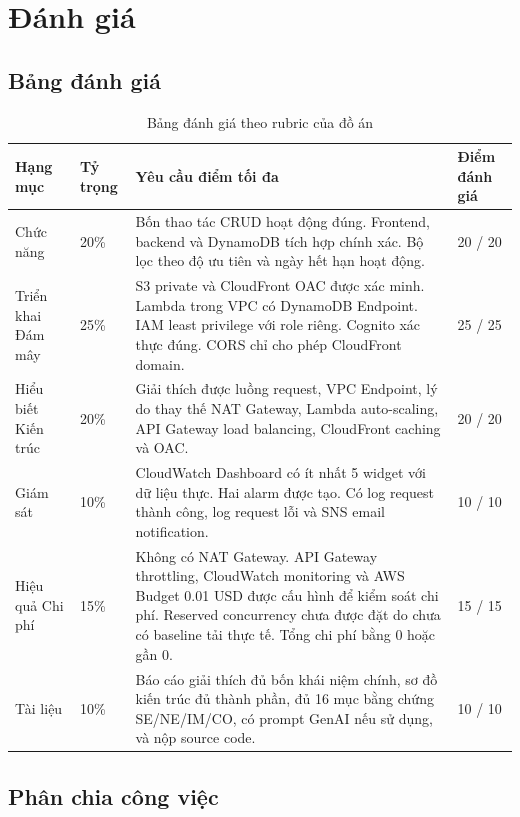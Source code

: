 \section{Đánh giá}

\subsection{Bảng đánh giá}

\begin{table}[H]
\centering
\begin{tabular}{|p{3cm}|p{1.7cm}|p{7.2cm}|p{2.2cm}|}
\hline
\textbf{Hạng mục} & \textbf{Tỷ trọng} & \textbf{Yêu cầu điểm tối đa} & \textbf{Điểm đánh giá} \\
\hline
Chức năng & 20\% & Bốn thao tác CRUD hoạt động đúng. Frontend, backend và DynamoDB tích hợp chính xác. Bộ lọc theo độ ưu tiên và ngày hết hạn hoạt động. & 20 / 20 \\
\hline
Triển khai Đám mây & 25\% & S3 private và CloudFront OAC được xác minh. Lambda trong VPC có DynamoDB Endpoint. IAM least privilege với role riêng. Cognito xác thực đúng. CORS chỉ cho phép CloudFront domain. & 25 / 25 \\
\hline
Hiểu biết Kiến trúc & 20\% & Giải thích được luồng request, VPC Endpoint, lý do thay thế NAT Gateway, Lambda auto-scaling, API Gateway load balancing, CloudFront caching và OAC. & 20 / 20 \\
\hline
Giám sát & 10\% & CloudWatch Dashboard có ít nhất 5 widget với dữ liệu thực. Hai alarm được tạo. Có log request thành công, log request lỗi và SNS email notification. & 10 / 10 \\
\hline
Hiệu quả Chi phí & 15\% & Không có NAT Gateway. API Gateway throttling, CloudWatch monitoring và AWS Budget 0.01 USD được cấu hình để kiểm soát chi phí. Reserved concurrency chưa được đặt do chưa có baseline tải thực tế. Tổng chi phí bằng 0 hoặc gần 0. & 15 / 15 \\
\hline
Tài liệu & 10\% & Báo cáo giải thích đủ bốn khái niệm chính, sơ đồ kiến trúc đủ thành phần, đủ 16 mục bằng chứng SE/NE/IM/CO, có prompt GenAI nếu sử dụng, và nộp source code. & 10 / 10 \\
\hline
\end{tabular}
\caption{Bảng đánh giá theo rubric của đồ án}
\end{table}

\subsection{Phân chia công việc}

